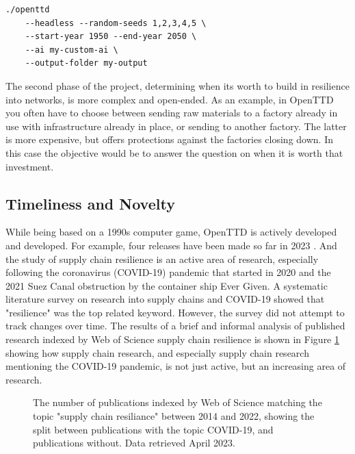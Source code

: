 \documentclass[a4paper,11pt]{article}
\begin{document}
\begin{verbatim}
./openttd
    --headless --random-seeds 1,2,3,4,5 \
    --start-year 1950 --end-year 2050 \
    --ai my-custom-ai \
    --output-folder my-output
\end{verbatim}

The second phase of the project, determining when its worth to build in resilience into networks, is more complex and open-ended. As an example, in OpenTTD you often have to choose between sending raw materials to a factory already in use with infrastructure already in place, or sending to another factory. The latter is more expensive, but offers protections against the factories closing down. In this case the objective would be to answer the question on when it is worth that investment.

\subsection{Timeliness and Novelty}

While being based on a 1990s computer game, OpenTTD is actively developed and developed. For example, four releases have been made so far in 2023 \cite{openttdReleases}. And the study of supply chain resilience is an active area of research, especially following the coronavirus (COVID-19) pandemic that started in 2020 and the 2021 Suez Canal obstruction by the container ship Ever Given. A systematic literature survey on research into supply chains and COVID-19 \cite{moosavi_supply_2022} showed that "resilience" was the top related keyword. However, the survey did not attempt to track changes over time. The results of a brief and informal analysis of published research indexed by Web of Science supply chain resilience is shown in Figure \ref{fig:supplychainresiliance} showing how supply chain research, and especially supply chain research mentioning the COVID-19 pandemic, is not just active, but an increasing area of research.

\begin{figure}[h]
\centering
{}
\caption{The number of publications indexed by Web of Science matching the topic "supply chain resiliance" between 2014 and 2022, showing the split between publications with the topic COVID-19, and publications without. Data retrieved April 2023.}
\label{fig:supplychainresiliance}
\end{figure}
\end{document}
